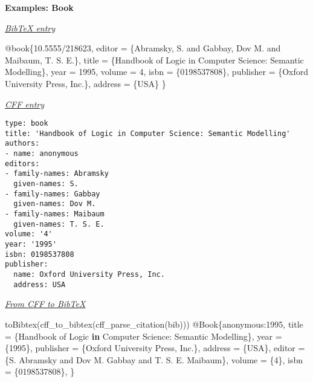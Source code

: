 \documentclass[
]{article}
\newenvironment{Shaded}{\begin{snugshade}}{\end{snugshade}}
\newcommand{\ControlFlowTok}[1]{\textcolor[rgb]{0.13,0.29,0.53}{\textbf{#1}}}
\newcommand{\DataTypeTok}[1]{\textcolor[rgb]{0.13,0.29,0.53}{#1}}
\newcommand{\DecValTok}[1]{\textcolor[rgb]{0.00,0.00,0.81}{#1}}
\newcommand{\FunctionTok}[1]{\textcolor[rgb]{0.00,0.00,0.00}{#1}}
\newcommand{\NormalTok}[1]{#1}
\newcommand{\OtherTok}[1]{\textcolor[rgb]{0.56,0.35,0.01}{#1}}
\newcommand{\SpecialCharTok}[1]{\textcolor[rgb]{0.00,0.00,0.00}{#1}}
\newcommand{\VariableTok}[1]{\textcolor[rgb]{0.00,0.00,0.00}{#1}}
\begin{document}
\textbf{Examples: Book}

\underline{\emph{BibTeX entry}}

\begin{Shaded}
\begin{Highlighting}[]
\VariableTok{@book}\NormalTok{\{}\OtherTok{10}\NormalTok{.}\OtherTok{5555}\NormalTok{/}\OtherTok{218623}\NormalTok{,}
    \DataTypeTok{editor}\NormalTok{       = \{Abramsky, S. and Gabbay, Dov M. and Maibaum, T. S. E.\},}
    \DataTypeTok{title}\NormalTok{        = \{Handbook of Logic in Computer Science: Semantic Modelling\},}
    \DataTypeTok{year}\NormalTok{         = 1995,}
    \DataTypeTok{volume}\NormalTok{       = 4,}
    \DataTypeTok{isbn}\NormalTok{         = \{0198537808\},}
    \DataTypeTok{publisher}\NormalTok{    = \{Oxford University Press, Inc.\},}
    \DataTypeTok{address}\NormalTok{      = \{USA\}}
\NormalTok{\}}
\end{Highlighting}
\end{Shaded}

\underline{\emph{CFF entry}}

\begin{verbatim}
type: book
title: 'Handbook of Logic in Computer Science: Semantic Modelling'
authors:
- name: anonymous
editors:
- family-names: Abramsky
  given-names: S.
- family-names: Gabbay
  given-names: Dov M.
- family-names: Maibaum
  given-names: T. S. E.
volume: '4'
year: '1995'
isbn: 0198537808
publisher:
  name: Oxford University Press, Inc.
  address: USA
\end{verbatim}

\underline{\emph{From CFF to BibTeX}}

\begin{Shaded}
\begin{Highlighting}[]
\FunctionTok{toBibtex}\NormalTok{(}\FunctionTok{cff\_to\_bibtex}\NormalTok{(}\FunctionTok{cff\_parse\_citation}\NormalTok{(bib)))}
\SpecialCharTok{@}\NormalTok{Book\{anonymous}\SpecialCharTok{:}\DecValTok{1995}\NormalTok{,}
\NormalTok{  title }\OtherTok{=}\NormalTok{ \{Handbook of Logic }\ControlFlowTok{in}\NormalTok{ Computer Science}\SpecialCharTok{:}\NormalTok{ Semantic Modelling\},}
\NormalTok{  year }\OtherTok{=}\NormalTok{ \{}\DecValTok{1995}\NormalTok{\},}
\NormalTok{  publisher }\OtherTok{=}\NormalTok{ \{Oxford University Press, Inc.\},}
\NormalTok{  address }\OtherTok{=}\NormalTok{ \{USA\},}
\NormalTok{  editor }\OtherTok{=}\NormalTok{ \{S. Abramsky and Dov M. Gabbay and T. S. E. Maibaum\},}
\NormalTok{  volume }\OtherTok{=}\NormalTok{ \{}\DecValTok{4}\NormalTok{\},}
\NormalTok{  isbn }\OtherTok{=}\NormalTok{ \{}\DecValTok{0198537808}\NormalTok{\},}
\NormalTok{\}}
\end{Highlighting}
\end{Shaded}
\end{document}
